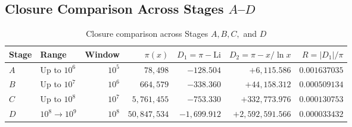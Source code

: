 \documentclass[12pt,a4paper]{article}
\begin{document}
\subsection{Closure Comparison Across Stages $A$--$D$}
\begin{table}[H]
\centering
\small
\begin{tabular}{llrrrrr}
\toprule
\textbf{Stage} & \textbf{Range} & \textbf{Window} & $\pi(x)$ & $D_1 = \pi - \mathrm{Li}$ & $D_2 = \pi - x/\ln x$ & $R = |D_1|/\pi$ \\
\midrule
$A$ & Up to $10^6$ & $10^5$ & $78,498$ & $-128.504$ & $+6,115.586$ & $0.001637035$ \\
$B$ & Up to $10^7$ & $10^6$ & $664,579$ & $-338.360$ & $+44,158.312$ & $0.000509134$ \\
$C$ & Up to $10^8$ & $10^7$ & $5,761,455$ & $-753.330$ & $+332,773.976$ & $0.000130753$ \\
$D$ & $10^8 \rightarrow 10^9$ & $10^8$ & $50,847,534$ & $-1,699.912$ & $+2,592,591.566$ & $0.000033432$ \\
\bottomrule
\end{tabular}
\caption{Closure comparison across Stages $A, B, C,$ and $D$}
\end{table}
\end{document}
